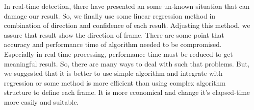 In real-time detection, there have presented an some un-known situation that can damage our result. So, we finally use some linear regression method in combination of direction and confidence of each result. Adjusting this method, we assure that result show the direction of frame. 
There are some point that accuracy and performance time of algorithm needed to be compromised. Especially in real-time processing, performance time must be reduced to get meaningful result. So, there are many ways to deal with such that problems. But, we suggested that it is better to use simple algorithm and integrate with regression or some method is more efficient than using complex algorithm structure to define each frame. It is more economical and change it's elapsed-time more easily and suitable.